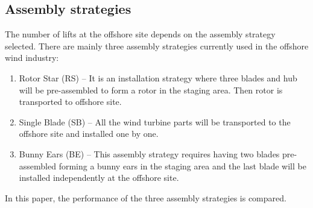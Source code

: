 \subsection{Assembly strategies}
The number of lifts at the offshore site depends on the assembly strategy selected. There are mainly three assembly strategies currently used in the offshore wind industry:

\begin{enumerate}
\item Rotor Star (RS) -- It is an installation strategy where three blades and hub will be pre-assembled to form a rotor in the staging area. Then rotor is transported to offshore site.
\item Single Blade (SB) -- All the wind turbine parts will be transported to the offshore site and installed one by one.
\item Bunny Ears (BE) -- This assembly strategy requires having two blades pre-assembled forming a bunny ears in the staging area and the last blade will be installed independently at the offshore site.
\end{enumerate}

In this paper, the performance of the three assembly strategies is compared.